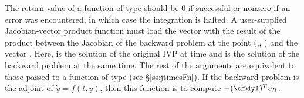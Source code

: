 {  
  The return value of a function of type  should be
  $0$ if successful or nonzero if an error was encountered, in which case
  the integration is halted.
}
{
  A user-supplied Jacobian-vector product function must load the vector 
  with the result of the product between the Jacobian of the backward problem 
  at the point (,, ) and the vector . 
  Here,  is the solution of the original IVP at time  and 
   is the solution of the backward problem at the same time.  
  The rest of the arguments are equivalent to those passed to a function of type
   (see \S\ref{ss:jtimesFn}).
  If the backward problem is the adjoint of ${\dot y} = f(t, y)$, then this 
  function is to compute $-(\dfdyI)^T v_B$.
}

